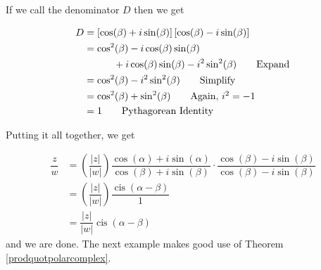 \medskip

If we call the denominator $D$ then we get


\begin{align*}
D & =  \left[\cos(\beta) + i\sin(\beta)\right]\left[\cos(\beta) - i\sin(\beta)\right]  \\ 
  & =  \cos^{2}(\beta) - i\cos(\beta)\sin(\beta)\\
  &\quad\quad\quad  + i\cos(\beta)\sin(\beta) - i^2 \sin^{2}(\beta)  \tag*{Expand}  \\
  & =  \cos^{2}(\beta) - i^2 \sin^{2}(\beta)  \tag*{Simplify}  \\
  & =  \cos^{2}(\beta) + \sin^{2}(\beta)   \tag*{Again, $i^{2} = -1$}\\
  & =  	1   \tag*{Pythagorean Identity}
\end{align*}


\medskip
																										 
Putting it all together, we get

\begin{align*}
\dfrac{z}{w} & =  \left( \dfrac{|z|}{|w|}\right) \dfrac{\cos(\alpha) + i \sin(\alpha)}{\cos(\beta) + i \sin(\beta)} \cdot \dfrac{\cos(\beta) - i \sin(\beta)}{\cos(\beta) - i \sin(\beta)}  \\[3pt]
						 & =  \left( \dfrac{|z|}{|w|}\right) \dfrac{\operatorname{cis}(\alpha - \beta)}{1}    \\[3pt]	 
						 & =   \dfrac{|z|}{|w|} \operatorname{cis}(\alpha - \beta)
\end{align*}
and we are done.  The next example makes good use of Theorem \ref{prodquotpolarcomplex}.

\medskip

